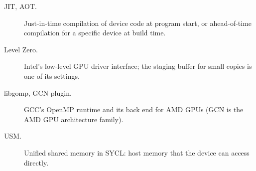 \begin{description}
\item[JIT, AOT.] Just-in-time compilation of device code at program start, or ahead-of-time compilation for a specific device at build time.
\item[Level Zero.] Intel's low-level GPU driver interface; the staging buffer for small copies is one of its settings.
\item[libgomp, GCN plugin.] GCC's OpenMP runtime and its back end for AMD GPUs (GCN is the AMD GPU architecture family).
\item[USM.] Unified shared memory in SYCL: host memory that the device can access directly.
\end{description}
